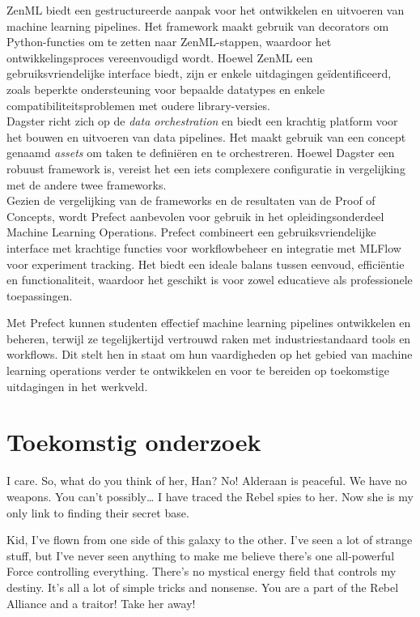 \documentclass[a0,portrait]{hogent-poster}
\begin{document}
\begin{multicols}{2}
ZenML biedt een gestructureerde aanpak voor het ontwikkelen en uitvoeren van machine learning pipelines. Het framework maakt gebruik van decorators om Py\-thon-functies om te zetten naar ZenML-stappen, waardoor het ontwikkelingsproces vereenvoudigd wordt. Hoewel ZenML een gebruiksvriendelijke interface biedt, zijn er enkele uitdagingen geïdentificeerd, zoals beperkte ondersteuning voor bepaalde datatypes en enkele compatibiliteitsproblemen met oudere library-versies.\\

Dagster richt zich op de \textit{data orchestration} en biedt een krachtig platform voor het bouwen en uitvoeren van data pipelines. Het maakt gebruik van een concept genaamd \textit{assets} om taken te definiëren en te orchestreren. Hoewel Dagster een robuust framework is, vereist het een iets complexere configuratie in vergelijking met de andere twee frameworks.\\

Gezien de vergelijking van de frameworks en de resultaten van de Proof of Concepts, wordt Prefect aanbevolen voor gebruik in het opleidingsonderdeel Machine Learning Operations. Prefect combineert een gebruiksvriendelijke interface met krachtige functies voor workflowbeheer en integratie met MLFlow voor experiment tracking. Het biedt een ideale balans tussen eenvoud, efficiëntie en functionaliteit, waardoor het geschikt is voor zowel educatieve als professionele toepassingen.

Met Prefect kunnen studenten effectief machine learning pipelines ontwikkelen en beheren, terwijl ze tegelijkertijd vertrouwd raken met industriestandaard tools en workflows. Dit stelt hen in staat om hun vaardigheden op het gebied van machine learning operations verder te ontwikkelen en voor te bereiden op toekomstige uitdagingen in het werkveld.
\section{Toekomstig onderzoek}

I care. So, what do you think of her, Han? No! Alderaan is peaceful. We have no weapons. You can't possibly… I have traced the Rebel spies to her. Now she is my only link to finding their secret base.

Kid, I've flown from one side of this galaxy to the other. I've seen a lot of strange stuff, but I've never seen anything to make me believe there's one all-powerful Force controlling everything. There's no mystical energy field that controls my destiny. It's all a lot of simple tricks and nonsense. You are a part of the Rebel Alliance and a traitor! Take her away! 

\end{multicols}
\end{document}

